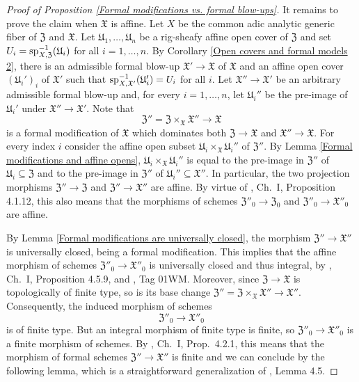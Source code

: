 \documentclass[12pt,twoside,a4paper]{article}
\theoremstyle{definition}
\theoremstyle{remark}
\newcommand\spc{{\rm sp}}
\begin{document}
\begin{proof}[Proof of Proposition \ref{Formal modifications vs. formal blow-ups}]
It remains to prove the claim when $\mathfrak{X}$ is affine. Let $X$ be the common adic analytic generic fiber of $\mathfrak{Z}$ and $\mathfrak{X}$. Let $\mathfrak{U}_{1},\dots, \mathfrak{U}_{n}$ be a rig-sheafy affine open cover of $\mathfrak{Z}$ and set $U_{i}=\spc_{X,\mathfrak{Z}}^{-1}(\mathfrak{U}_{i})$ for all $i=1,\dots, n$. By Corollary \ref{Open covers and formal models 2}, there is an admissible formal blow-up $\mathfrak{X}'\to\mathfrak{X}$ of $\mathfrak{X}$ and an affine open cover $(\mathfrak{U}_{i}')_{i}$ of $\mathfrak{X}'$ such that $\spc_{X,\mathfrak{X}'}^{-1}(\mathfrak{U}_{i}')=U_{i}$ for all $i$. Let $\mathfrak{X}''\to\mathfrak{X}'$ be an arbitrary admissible formal blow-up and, for every $i=1,\dots, n$, let $\mathfrak{U}_{i}''$ be the pre-image of $\mathfrak{U}_{i}'$ under $\mathfrak{X}''\to\mathfrak{X}'$. Note that \begin{equation*}\mathfrak{Z}''=\mathfrak{Z}\times_{\mathfrak{X}}\mathfrak{X}''\to\mathfrak{X}\end{equation*}is a formal modification of $\mathfrak{X}$ which dominates both $\mathfrak{Z}\to\mathfrak{X}$ and $\mathfrak{X}''\to\mathfrak{X}$. For every index $i$ consider the affine open subset $\mathfrak{U}_{i}\times_{\mathfrak{X}}\mathfrak{U}_{i}''$ of $\mathfrak{Z}''$. By Lemma \ref{Formal modifications and affine opens}, $\mathfrak{U}_{i}\times_{\mathfrak{X}}\mathfrak{U}_{i}''$ is equal to the pre-image in $\mathfrak{Z}''$ of $\mathfrak{U}_{i}\subseteq \mathfrak{Z}$ and to the pre-image in $\mathfrak{Z}''$ of $\mathfrak{U}_{i}''\subseteq\mathfrak{X}''$. In particular, the two projection morphisms $\mathfrak{Z}''\to \mathfrak{Z}$ and $\mathfrak{Z}''\to\mathfrak{X}''$ are affine. By virtue of \cite{FK}, Ch.~I, Proposition 4.1.12, this also means that the morphisms of schemes $\mathfrak{Z}''_{0}\to \mathfrak{Z}_{0}$ and $\mathfrak{Z}''_{0}\to \mathfrak{X}''_{0}$ are affine.    

By Lemma \ref{Formal modifications are universally closed}, the morphism $\mathfrak{Z}''\to\mathfrak{X}''$ is universally closed, being a formal modification. This implies that the affine morphism of schemes $\mathfrak{Z}''_{0}\to \mathfrak{X}''_{0}$ is universally closed and thus integral, by \cite{FK}, Ch.~I, Proposition 4.5.9, and \cite{Stacks}, Tag 01WM. Moreover, since $\mathfrak{Z}\to\mathfrak{X}$ is topologically of finite type, so is its base change $\mathfrak{Z}''=\mathfrak{Z}\times_{\mathfrak{X}}\mathfrak{X}''\to\mathfrak{X}''$. Consequently, the induced morphism of schemes $$\mathfrak{Z}''_{0}\to \mathfrak{X}''_{0}$$ is of finite type. But an integral morphism of finite type is finite, so $\mathfrak{Z}''_{0}\to \mathfrak{X}''_{0}$ is a finite morphism of schemes. By \cite{FK}, Ch.~I, Prop.~4.2.1, this means that the morphism of formal schemes $\mathfrak{Z}''\to\mathfrak{X}''$ is finite and we can conclude by the following lemma, which is a straightforward generalization of \cite{BL1}, Lemma 4.5.\end{proof}
\end{document}
